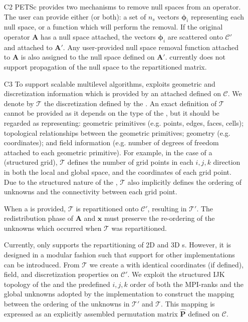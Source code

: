 \documentclass[]{siamart0216}
\newcommand{\dmat}[1]{\mathbf{#1}}
\newcommand{\dvec}[1]{\mathbf{#1}}
\begin{document}
\begin{itemize}
\item[C2] PETSc provides two mechanisms to remove null spaces from an operator.
	The user can provide either (or both): 
	  a set of $n_s$ vectors $\pmb \phi_i$ representing each null space, or
	  a function which will perform the removal.
	If the original operator $\dmat A$ has a null space attached, the vectors $\pmb \phi_i$ are scattered onto $\mathcal C'$
	and attached to $\dmat A'$. Any user-provided null space removal function attached to $\dmat A$ 
	is also assigned to the null space defined on $\dmat A'$. 
	 currently does not support propagation of the null space to the repartitioned matrix.
\item[C3] To support scalable multilevel algorithms,  exploits geometric 
	and discretization information which is provided by an attached  defined on $\mathcal C$. 
We denote by $\mathcal T$ the discretization defined by the .
	An exact definition of $\mathcal T$ cannot be provided as it depends on the type of the , 
	but it should be regarded as representing: geometric primitives (e.g. points, edges, faces, cells);
	topological relationships between the geometric primitives; 
	geometry (e.g. coordinates); and field information (e.g. number of degrees of freedom attached to each geometric primitive).
	For example, in the case of a  (structured grid), $\mathcal T$ defines the number of grid 
	points in each $i,j,k$ direction in both the local and global space, and the coordinates of each grid point. 
	Due to the  structured nature of the , $\mathcal T$ also implicitly defines the ordering of unknowns and the 
	connectivity between each grid point.
	
	When a  is provided, $\mathcal T$ is repartitioned onto $\mathcal C'$, resulting in $\mathcal T'$. 
	The redistribution phase of $\dmat A$ and $\dvec x$ must preserve the re-ordering of the unknowns which occurred 
	when $\mathcal T$ was repartitioned. 
	 	
	Currently,  only supports the repartitioning of 2D and 3D s. However, it is designed 
	in a modular fashion such that support for other  implementations can be introduced. 
	From $\mathcal T$ we create a  with identical coordinates (if defined), field, and 
	discretization properties on $\mathcal C'$. 
	We exploit the structured IJK topology of the  and the predefined $i,j,k$ order of 
	both the MPI-ranks and the global unknowns adopted by the  implementation to construct 
	the mapping between the ordering of the unknowns in $\mathcal T'$ and $\mathcal T$. 
	This mapping is expressed as an explicitly assembled permutation matrix $\hat{\dmat P}$ defined on $\mathcal C$. 
	

\end{itemize}
\end{document}

